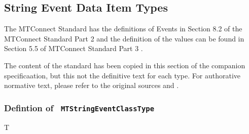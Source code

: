 \FloatBarrier
\subsection{String Event Data Item Types} \label{model:StringEventDataItemTypes}

The MTConnect Standard has the definitions of Events in 
Section 8.2 of the MTConnect Standard Part 2 \cite{MTCPart2} and the 
definition of the values can be found in Section 5.5 of MTConnect Standard Part 3 \cite{MTCPart3}. 

The content of the standard has been copied in this section of the companion specificaation,
but this not the definitive text for each type. For authorative normative text, please refer 
to the original sources \cite{MTCPart2} and \cite{MTCPart3}.

\subsubsection{Defintion of \texttt{ MTStringEventClassType}} \label{type:MTStringEventClassType}

\FloatBarrier

T

